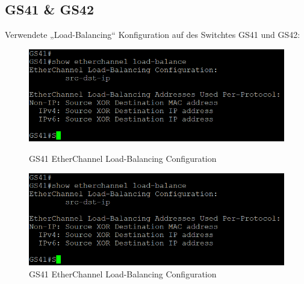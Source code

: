 \documentclass{article}
\begin{document}
\subsection{GS41 \& GS42}
Verwendete „Load-Balancing“ Konfiguration auf des Switchtes GS41 und GS42:\\
\begin{figure}[!htp]
  \centering
  \begin{minipage}[b]{0.45\textwidth}
    \includegraphics[width=\textwidth]{Arbeitsergebnisse/GS41/GS41_etherchannel.png}
    \caption{GS41 EtherChannel Load-Balancing Configuration}
  \end{minipage}
  \hspace{0.8cm}
  \begin{minipage}[b]{0.45\textwidth}
    \includegraphics[width=\textwidth]{Arbeitsergebnisse/GS41/GS41_etherchannel.png}
    \caption{GS41 EtherChannel Load-Balancing Configuration}
  \end{minipage}
\end{figure}

\pagebreak
\end{document}
